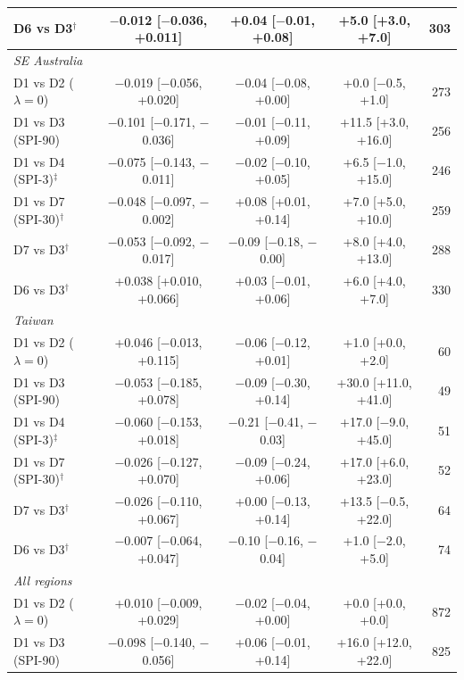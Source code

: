 \begin{table}[tbp]
\begin{tabular*}{\textwidth}{@{\extracolsep\fill}lcccr}
\quad D6 vs D3$^{\dagger}$ & $-$0.012 [$-$0.036, +0.011] & +0.04 [$-$0.01, +0.08] & +5.0 [+3.0, +7.0] & 303 \\
\midrule
\multicolumn{5}{l}{\textit{SE Australia}}\\
\quad D1 vs D2 ($\lambda=0$) & $-$0.019 [$-$0.056, +0.020] & $-$0.04 [$-$0.08, +0.00] & +0.0 [$-$0.5, +1.0] & 273 \\
\quad D1 vs D3 (SPI-90) & $-$0.101 [$-$0.171, $-$0.036] & $-$0.01 [$-$0.11, +0.09] & +11.5 [+3.0, +16.0] & 256 \\
\quad D1 vs D4 (SPI-3)$^{\ddagger}$ & $-$0.075 [$-$0.143, $-$0.011] & $-$0.02 [$-$0.10, +0.05] & +6.5 [$-$1.0, +15.0] & 246 \\
\quad D1 vs D7 (SPI-30)$^{\dagger}$ & $-$0.048 [$-$0.097, $-$0.002] & +0.08 [+0.01, +0.14] & +7.0 [+5.0, +10.0] & 259 \\
\quad D7 vs D3$^{\dagger}$ & $-$0.053 [$-$0.092, $-$0.017] & $-$0.09 [$-$0.18, $-$0.00] & +8.0 [+4.0, +13.0] & 288 \\
\quad D6 vs D3$^{\dagger}$ & +0.038 [+0.010, +0.066] & +0.03 [$-$0.01, +0.06] & +6.0 [+4.0, +7.0] & 330 \\
\midrule
\multicolumn{5}{l}{\textit{Taiwan}}\\
\quad D1 vs D2 ($\lambda=0$) & +0.046 [$-$0.013, +0.115] & $-$0.06 [$-$0.12, +0.01] & +1.0 [+0.0, +2.0] & 60 \\
\quad D1 vs D3 (SPI-90) & $-$0.053 [$-$0.185, +0.078] & $-$0.09 [$-$0.30, +0.14] & +30.0 [+11.0, +41.0] & 49 \\
\quad D1 vs D4 (SPI-3)$^{\ddagger}$ & $-$0.060 [$-$0.153, +0.018] & $-$0.21 [$-$0.41, $-$0.03] & +17.0 [$-$9.0, +45.0] & 51 \\
\quad D1 vs D7 (SPI-30)$^{\dagger}$ & $-$0.026 [$-$0.127, +0.070] & $-$0.09 [$-$0.24, +0.06] & +17.0 [+6.0, +23.0] & 52 \\
\quad D7 vs D3$^{\dagger}$ & $-$0.026 [$-$0.110, +0.067] & +0.00 [$-$0.13, +0.14] & +13.5 [$-$0.5, +22.0] & 64 \\
\quad D6 vs D3$^{\dagger}$ & $-$0.007 [$-$0.064, +0.047] & $-$0.10 [$-$0.16, $-$0.04] & +1.0 [$-$2.0, +5.0] & 74 \\
\midrule
\multicolumn{5}{l}{\textit{All regions}}\\
\quad D1 vs D2 ($\lambda=0$) & +0.010 [$-$0.009, +0.029] & $-$0.02 [$-$0.04, +0.00] & +0.0 [+0.0, +0.0] & 872 \\
\quad D1 vs D3 (SPI-90) & $-$0.098 [$-$0.140, $-$0.056] & +0.06 [$-$0.01, +0.14] & +16.0 [+12.0, +22.0] & 825 \\

\end{tabular*}
\end{table}
